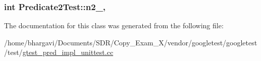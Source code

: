 \subsubsection[{\texorpdfstring{n2\+\_\+}{n2_}}]{\setlength{\rightskip}{0pt plus 5cm}int Predicate2\+Test\+::n2\+\_\+\hspace{0.3cm}{\ttfamily [static]}, {\ttfamily [protected]}}\hypertarget{class_predicate2_test_a9dbe5173570b9b911af2df889c287027}{}\label{class_predicate2_test_a9dbe5173570b9b911af2df889c287027}


The documentation for this class was generated from the following file\+:\begin{DoxyCompactItemize}
\item 
/home/bhargavi/\+Documents/\+S\+D\+R/\+Copy\+\_\+\+Exam\+\_\+X/vendor/googletest/googletest/test/\hyperlink{gtest__pred__impl__unittest_8cc}{gtest\+\_\+pred\+\_\+impl\+\_\+unittest.\+cc}\end{DoxyCompactItemize}
